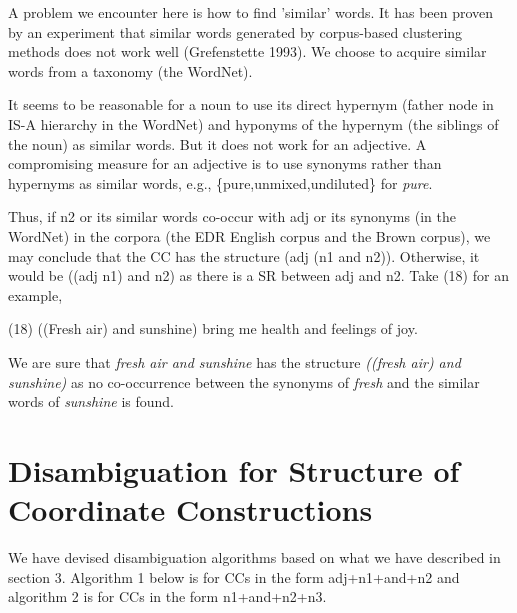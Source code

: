 A problem we encounter here  is how to find 'similar' words. It has
been proven by an experiment that
similar words generated by corpus-based clustering methods does not
work well (Grefenstette 1993). We choose to
acquire similar words from a taxonomy (the WordNet).



It seems to be reasonable for a noun to use its direct 
hypernym (father node in IS-A hierarchy in the WordNet) and
hyponyms of the hypernym (the siblings of the noun) as similar
words. But it does not work for an adjective. 
A compromising measure for an adjective is to use synonyms rather than hypernyms as
similar words, e.g., \{pure,unmixed,undiluted\} for {\it pure}.

Thus, if n2 or its similar words co-occur with adj or its synonyms (in the WordNet)
in the corpora (the EDR English corpus and the Brown corpus), we may conclude
that the CC has the structure (adj (n1 and n2)). Otherwise, it would be
((adj n1) and n2) as there is a SR between adj and n2. Take (18) for an example,


\vspace*{4mm}

\hspace*{5mm}(18) ((Fresh air) and sunshine) bring me health and
feelings of joy.

\vspace*{4mm}
\hspace*{-4mm}We are sure that {\it fresh air and sunshine} has the structure 
{\it ((fresh air) and sunshine)} as no co-occurrence between 
the synonyms of {\it fresh} and the similar words of
{\it sunshine} is found.



\section{Disambiguation for Structure of Coordinate Constructions}

We have devised disambiguation algorithms based on what we have described in section 3.
Algorithm 1 below is for CCs in the form adj+n1+and+n2 and algorithm 2 is for CCs in the form
n1+and+n2+n3. 


\vspace*{4mm}

\hspace*{-5mm}{\bf Algorithm 1: Disambiguation of CCs in the form adj+n1+and+n2}

